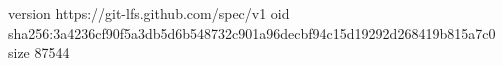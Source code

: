version https://git-lfs.github.com/spec/v1
oid sha256:3a4236cf90f5a3db5d6b548732c901a96decbf94c15d19292d268419b815a7c0
size 87544
